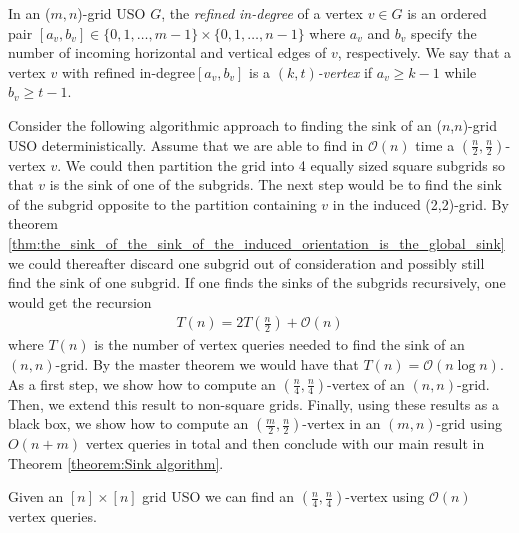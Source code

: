 \documentclass[runningheads,a4paper]{llncs}
\newcommand{\JN}[1]{\marginpar{\parbox{4cm}{{\small {\bf JN:} #1}}}} %
\newcommand{\indegree}{refined in-degree\xspace}
\begin{document}

In an ($m,n$)-grid USO $G$, the \emph{\indegree} of a vertex $v \in G$ is an ordered pair $[a_v, b_v] \in \{0,1,\ldots,m-1\}\times \{0,1,\ldots,n-1\}$ where $a_v$ and $b_v$ specify the number of incoming horizontal  and vertical edges of $v$, respectively.
We say that a vertex $v$ with \indegree $[a_v, b_v]$ is a \emph{$(k, t)$-vertex} if $a_v\geq k-1$ while $b_v\geq t-1$.

Consider the following algorithmic approach to finding the sink of an ($n$,$n$)-grid USO deterministically. 
Assume that we are able to find in $\mathcal{O}(n)$ time a $(\frac{n}{2}, \frac{n}{2})$-vertex $v$.
We could then partition the grid into 4 equally sized square subgrids so that $v$ is the sink of one of the subgrids.
The next step would be to find the sink of the subgrid opposite to the partition containing $v$ in the induced (2,2)-grid. 
By theorem \ref{thm:the_sink_of_the_sink_of_the_induced_orientation_is_the_global_sink} we could thereafter discard one subgrid out of consideration and possibly still find the sink of one subgrid.
If one finds the sinks of the subgrids recursively, one would get the recursion
\begin{align*}
 T(n) = 2T\left(\frac{n}{2}\right) + \mathcal{O}(n)
\end{align*}
where $T(n)$ is the number of vertex queries needed to find the sink of an $(n,n)$-grid. By the master theorem we would have that $T(n) = \mathcal{O}(n\log n)$. 
As a first step, we show how to compute an $(\frac{n}{4}, \frac{n}{4})$-vertex of an $(n, n)$-grid. Then, we extend this result to non-square grids. Finally, using these results as a black box, we show how to compute an $(\frac{m}{2}, \frac{n}{2})$-vertex in an $(m,n)$-grid using $O(n+m)$ vertex queries in total and then conclude with our main result in Theorem \ref{theorem:Sink algorithm}. 

\begin{lemma}
\label{lem:seed_lemma_for_square_matrices}
 Given an $[n]\times [n]$ grid USO we can find an $(\frac{n}{4}, \frac{n}{4})$-vertex using $\mathcal{O}(n)$ vertex queries.
\end{lemma}
\end{document}
